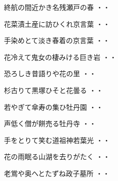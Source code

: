 \vspace{0.6cm}
\begin{shiika}終航の間近かき名残瀬戸の春
\hfill{・・}\end{shiika}
\vspace{0.6cm}
\begin{shiika}花菜漬土産に訪ひくれ京言葉
\hfill{・・}\end{shiika}
\vspace{0.6cm}
\begin{shiika}手染めとて淡き春着の京言葉
\hfill{・・}\end{shiika}
\vspace{0.6cm}
\begin{shiika}花冷えて鬼女の棲みける巨き岩
\hfill{・・}\end{shiika}
\vspace{0.6cm}
\begin{shiika}恐ろしき昔語りや花の里
\hfill{・・}\end{shiika}
\vspace{0.6cm}
\begin{shiika}杉古りて黒塚ひそと花曇る
\hfill{・・}\end{shiika}
\vspace{0.6cm}
\begin{shiika}若やぎて傘寿の集ひ牡丹園
\hfill{・・}\end{shiika}
\vspace{0.6cm}
\begin{shiika}声低く僧が餅売る牡丹寺
\hfill{・・}\end{shiika}
\vspace{0.6cm}
\begin{shiika}手をとりて笑む道祖神若葉光
\hfill{・・}\end{shiika}
\vspace{0.6cm}
\begin{shiika}花の雨眠る山湖を去りがたく
\hfill{・・}\end{shiika}
\vspace{0.6cm}
\begin{shiika}老鴬や奥へとたずね政子墓所
\hfill{・・}\end{shiika}
